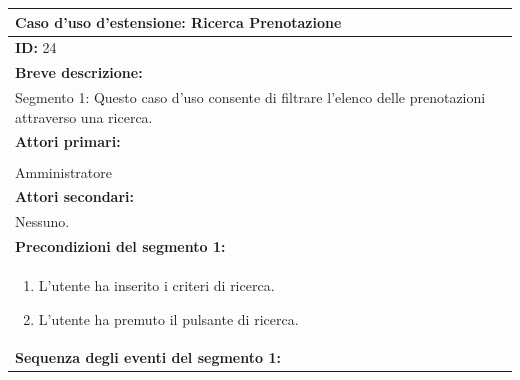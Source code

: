 \documentclass{article}
\begin{document}
                \begin{table}[H]
                    \begin{tabular}{|p{\linewidth}|}
                        \hline
                        \cellcolor{gray!100}
                        \color{white}
                        \centerline{\textbf{Caso d'uso d'estensione:} Ricerca Prenotazione} \\
                        \hline
                        \textbf{ID:} 24 \\
                        \hline
                        \cellcolor{gray!20}
                        \textbf{Breve descrizione:} \\
                        \cellcolor{gray!20}
                        Segmento 1: Questo caso d'uso consente di filtrare l'elenco delle prenotazioni attraverso una ricerca. \\
                        \hline
                        \textbf{Attori primari:} \\
                        \begin{minipage}{\linewidth}
                            Biglietteria \\
                            Amministratore
                        \end{minipage}
                        \vspace{0pt} \\
                        \hline
                        \textbf{Attori secondari:} \\
                        Nessuno. \\
                        \hline
                        \cellcolor{gray!20}
                        \textbf{Precondizioni del segmento 1:} \\
                        \cellcolor{gray!20}
                        \begin{minipage}{\linewidth}
                            \begin{enumerate}
                                \item L'utente ha inserito i criteri di ricerca.
                                \item L'utente ha premuto il pulsante di ricerca.
                            \end{enumerate}
                        \end{minipage} \\
                        \hline
                        \textbf{Sequenza degli eventi del segmento 1:}

\end{tabular}
\end{table}
\end{document}
